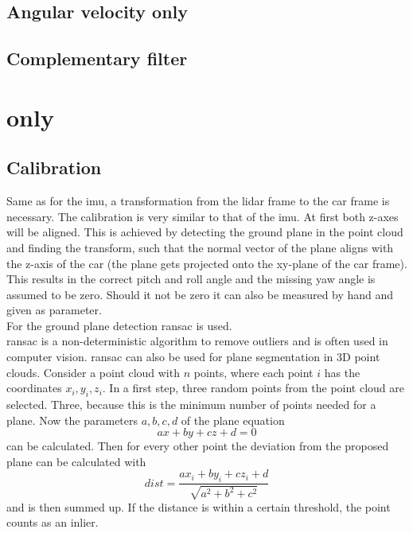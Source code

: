 \subsection{Angular velocity only}


\subsection{Complementary filter}



\section{ only}
\subsection{Calibration}
Same as for the \gls{imu}, a transformation from the \gls{lidar} frame to the car frame is necessary.
The calibration is very similar to that of the \gls{imu}.
At first both z-axes will be aligned.
This is achieved by detecting the ground plane in the point cloud and finding the transform, such that the normal vector of the plane aligns with the z-axis of the car (the plane gets projected onto the xy-plane of the car frame).
This results in the correct pitch and roll angle and the missing yaw angle is assumed to be zero.
Should it not be zero it can also be measured by hand and given as parameter.\\
For the ground plane detection \gls{ransac} \cite{Fischler1981} is used.\\
\gls{ransac} is a non-deterministic algorithm to remove outliers and is often used in computer vision.
\gls{ransac} can also be used for plane segmentation in 3D point clouds.
Consider a point cloud with $n$ points, where each point $i$ has the coordinates $x_i, y_i, z_i$.
In a first step, three random points from the point cloud are selected.
Three, because this is the minimum number of points needed for a plane.
Now the parameters $a, b, c, d$ of the plane equation
\begin{equation}
    ax + by + cz + d = 0
\end{equation}
can be calculated.
Then for every other point the deviation from the proposed plane can be calculated with
\begin{equation}
    dist = \frac{ax_i + by_i + cz_i + d}{\sqrt{a^2 + b^2 + c^2}}
\end{equation}
and is then summed up.
If the distance is within a certain threshold, the point counts as an inlier.
